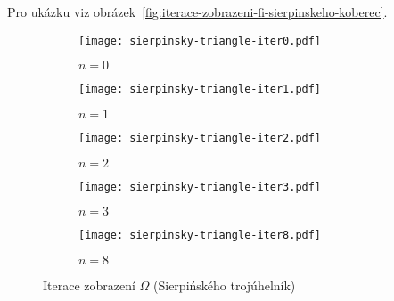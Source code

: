 Pro ukázku viz obrázek~\ref{fig:iterace-zobrazeni-fi-sierpinskeho-koberec}.
\clearpage
\begin{figure}[h]
    \centering
    \begin{subfigure}{0.45\textwidth}
        \centering
        \texttt{[image: sierpinsky-triangle-iter0.pdf]}
        \begin{center}
            $n=0$
        \end{center}
    \end{subfigure}
    \qquad
    \vspace{1cm}
    \begin{subfigure}{0.45\textwidth}
        \centering
        \texttt{[image: sierpinsky-triangle-iter1.pdf]}
        \begin{center}
            $n=1$
        \end{center}
    \end{subfigure}
    \qquad
    \begin{subfigure}{0.45\textwidth}
        \centering
        \texttt{[image: sierpinsky-triangle-iter2.pdf]}
        \begin{center}
            $n=2$
        \end{center}
    \end{subfigure}
    \qquad
    \vspace{1cm}
    \begin{subfigure}{0.45\textwidth}
        \centering
        \texttt{[image: sierpinsky-triangle-iter3.pdf]}
        \begin{center}
            $n=3$
        \end{center}
    \end{subfigure}
    \qquad
    \begin{subfigure}{0.45\textwidth}
        \centering
        \texttt{[image: sierpinsky-triangle-iter8.pdf]}
        \begin{center}
            $n=8$
        \end{center}
    \end{subfigure}
    \caption{Iterace zobrazení $\Omega$  (Sierpińského trojúhelník)}
    \label{fig:iterace-zobrazeni-omega-sierpinskeho-trojuhelnik}
\end{figure}
\clearpage
